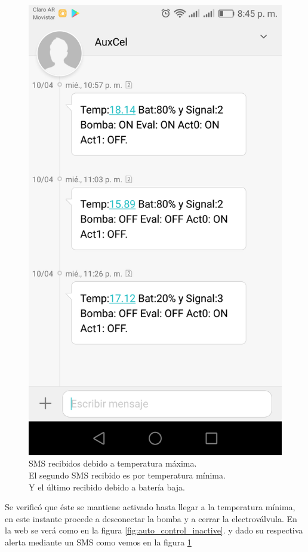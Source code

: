\begin{figure}[h]
  \centering
  \includegraphics[scale=.15]{./Figures/sms_min_max_bat.png}
  \caption{SMS recibidos debido a temperatura máxima. \\
   El segundo SMS recibido es por temperatura mínima. \\
   Y el último recibido debido a batería baja.}
  \label{fig:sms_min_max_bat}
\end{figure}

Se verificó que éste se mantiene activado hasta llegar a la temperatura mínima, en este instante procede a desconectar la bomba y a cerrar la electroválvula. En la web se verá como en la figura \ref{fig:auto_control_inactive}. y dado su respectiva alerta mediante un SMS como vemos en la figura \ref{fig:sms_min_max_bat}

